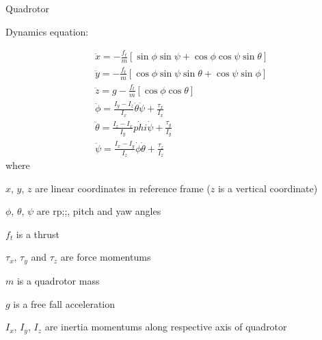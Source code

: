 \documentclass{article}
\begin{document}
\begin{center}
	Quadrotor
\end{center}


Dynamics equation:

\begin{eqnarray}
	& \ddot{x} = -\frac{f_t}{m}[\sin \phi \sin \psi + \cos \phi \cos \psi \sin \theta] \\
	& \ddot{y} = -\frac{f_t}{m}[\cos \phi \sin \psi \sin \theta + \cos \psi \sin \phi] \\
	& \ddot{z} = g - \frac{f_t}{m}[\cos \phi \cos \theta]\\
	& \ddot{\phi} = \frac{I_y-I_z}{I_x}\dot{\theta}\dot{\psi} + \frac{\tau_x}{I_x}\\
	& \ddot{\theta} = \frac{I_z-I_x}{I_y}\dot{phi}\dot{\psi} + \frac{\tau_y}{I_y}\\
	& \ddot{\psi} = \frac{I_x-I_y}{I_z}\dot{\phi}\dot{\theta} + \frac{\tau_z}{I_z}
\end{eqnarray}
where 

$x$, $y$, $z$ are linear coordinates in reference frame ($z$ is a vertical coordinate)

$\phi$, $\theta$, $\psi$ are rp;;, pitch and yaw angles

$f_t$ is a thrust

$\tau_x$, $\tau_y$ and $\tau_z$ are force momentums

$m$ is a quadrotor mass

$g$ is a free fall  acceleration

$I_x$, $I_y$, $I_z$ are inertia momentums along respective axis of quadrotor



	
\end{document}
